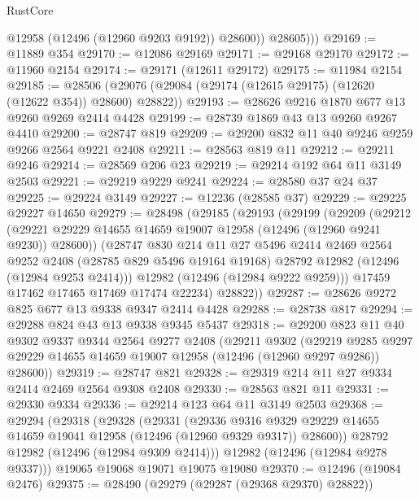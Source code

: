 \begin{lexlean}{RustCore}
\begin{coremodule}
              @12958
              (@12496 (@12960 @9203 @9192))
              @28600))
          @28605)))
@29169 := @11889 @354
@29170 := @12086 @29169
@29171 := @29168 @29170
@29172 := @11960 @2154
@29174 := @29171 (@12611 @29172)
@29175 := @11984 @2154
@29185 := @28506 (@29076 (@29084 (@29174 (@12615 @29175) (@12620 (@12622 @354)) @28600) @28822))
@29193 := @28626 @9216 @1870 @677 @13 @9260 @9269 @2414 @4428
@29199 := @28739 @1869 @43 @13 @9260 @9267 @4410
@29200 := @28747 @819
@29209 := @29200 @832 @11 @40 @9246 @9259 @9266 @2564 @9221 @2408
@29211 := @28563 @819 @11
@29212 := @29211 @9246
@29214 := @28569 @206 @23
@29219 := @29214 @192 @64 @11 @3149 @2503
@29221 := @29219 @9229 @9241
@29224 := @28580 @37 @24 @37
@29225 := @29224 @3149
@29227 := @12236 (@28585 @37)
@29229 := @29225 @29227 @14650
@29279 := @28498
    (@29185
      (@29193
        (@29199
          (@29209
            (@29212
              (@29221 @29229 @14655 @14659 @19007 @12958 (@12496 (@12960 @9241 @9230)) @28600))
            (@28747
              @830
              @214
              @11
              @27
              @5496
              @2414
              @2469
              @2564
              @9252
              @2408
              (@28785 @829 @5496 @19164 @19168)
              @28792
              @12982
              (@12496 (@12984 @9253 @2414)))
            @12982
            (@12496 (@12984 @9222 @9259)))
          @17459
          @17462
          @17465
          @17469
          @17474
          @22234)
        @28822))
@29287 := @28626 @9272 @825 @677 @13 @9338 @9347 @2414 @4428
@29288 := @28738 @817
@29294 := @29288 @824 @43 @13 @9338 @9345 @5437
@29318 := @29200
    @823
    @11
    @40
    @9302
    @9337
    @9344
    @2564
    @9277
    @2408
    (@29211
      @9302
      (@29219 @9285 @9297 @29229 @14655 @14659 @19007 @12958 (@12496 (@12960 @9297 @9286)) @28600))
@29319 := @28747 @821
@29328 := @29319 @214 @11 @27 @9334 @2414 @2469 @2564 @9308 @2408
@29330 := @28563 @821 @11
@29331 := @29330 @9334
@29336 := @29214 @123 @64 @11 @3149 @2503
@29368 := @29294
    (@29318
      (@29328
        (@29331
          (@29336
            @9316
            @9329
            @29229
            @14655
            @14659
            @19041
            @12958
            (@12496 (@12960 @9329 @9317))
            @28600))
        @28792
        @12982
        (@12496 (@12984 @9309 @2414)))
      @12982
      (@12496 (@12984 @9278 @9337)))
    @19065
    @19068
    @19071
    @19075
    @19080
@29370 := @12496 (@19084 @2476)
@29375 := @28490 (@29279 (@29287 (@29368 @29370) @28822))

\end{coremodule}
\end{lexlean}

